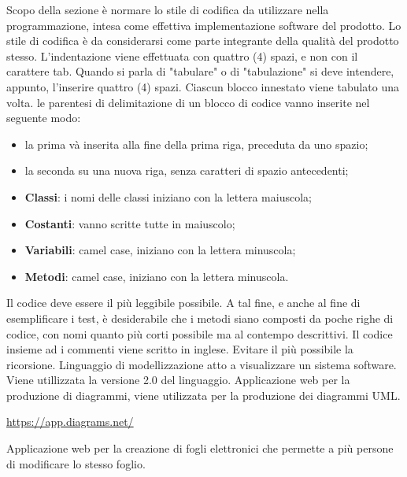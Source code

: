 	    Scopo della sezione è normare lo stile di codifica da utilizzare nella programmazione, intesa come effettiva implementazione software del prodotto. Lo stile di codifica è da considerarsi come parte integrante della qualità del prodotto stesso.
	    L'indentazione viene effettuata con quattro (4) spazi, e non con il carattere tab. Quando si parla di "tabulare" o di "tabulazione" si deve intendere, appunto, l'inserire quattro (4) spazi.
	    Ciascun blocco innestato viene tabulato una volta.
	    le parentesi di delimitazione di un blocco di codice vanno inserite nel seguente modo:
	    \begin{itemize}
	        \item la prima và inserita alla fine della prima riga, preceduta da uno spazio;
	        \item la seconda su una nuova riga, senza caratteri di spazio antecedenti;
	    \end{itemize}
	    
	    \begin{itemize}
	        \item \textbf{Classi}: i nomi delle classi iniziano con la lettera maiuscola;
	        \item \textbf{Costanti}: vanno scritte tutte in maiuscolo;
	        \item \textbf{Variabili}: camel case, iniziano con la lettera minuscola;
	        \item \textbf{Metodi}: camel case, iniziano con la lettera minuscola.
	    \end{itemize}
	    Il codice deve essere il più leggibile possibile. A tal fine, e anche al fine di esemplificare i test, è desiderabile che i metodi siano composti da poche righe di codice, con nomi quanto più corti possibile ma al contempo descrittivi.
	    Il codice insieme ad i commenti viene scritto in inglese.
	    Evitare il più possibile la ricorsione.
	    Linguaggio di modellizzazione atto a visualizzare un sistema software. Viene utillizzata la versione 2.0 del linguaggio.
	    Applicazione web per la produzione di diagrammi, viene utilizzata per la produzione dei diagrammi UML.\\
	    \centerline{\url{https://app.diagrams.net/}}
	    Applicazione web per la creazione di fogli elettronici che permette a più persone di modificare lo stesso foglio.
